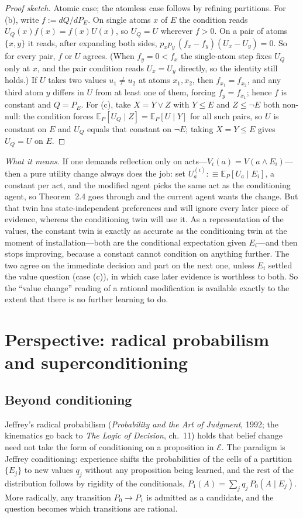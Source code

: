 \documentclass[11pt,a4paper]{article}
\newcommand{\E}{\mathbb{E}}
\newcommand{\cE}{\mathcal{E}}
\begin{document}
\begin{proof}[Proof sketch]
Atomic case; the atomless case follows by refining partitions. For (b), write $f := dQ/dP_E$. On single atoms $x$ of $E$ the condition reads $U_Q(x) f(x) = f(x) U(x)$, so $U_Q = U$ wherever $f > 0$. On a pair of atoms $\{x, y\}$ it reads, after expanding both sides, $p_x p_y\,(f_x - f_y)(U_x - U_y) = 0$. So for every pair, $f$ or $U$ agrees. (When $f_y = 0 < f_x$ the single-atom step fixes $U_Q$ only at $x$, and the pair condition reads $U_x = U_y$ directly, so the identity still holds.) If $U$ takes two values $u_1 \ne u_2$ at atoms $x_1, x_2$, then $f_{x_1} = f_{x_2}$, and any third atom $y$ differs in $U$ from at least one of them, forcing $f_y = f_{x_1}$; hence $f$ is constant and $Q = P_E$. For (c), take $X = Y \vee Z$ with $Y \le E$ and $Z \le \neg E$ both non-null: the condition forces $\E_P[U_Q \mid Z] = \E_P[U \mid Y]$ for all such pairs, so $U$ is constant on $E$ and $U_Q$ equals that constant on $\neg E$; taking $X = Y \le E$ gives $U_Q = U$ on $E$.
\end{proof}

\emph{What it means.} If one demands reflection only on acts---$V_i(a) = V(a \wedge E_i)$---then a pure utility change always does the job: set $U^{(i)}_a :\equiv \E_P[U_a \mid E_i]$, a constant per act, and the modified agent picks the same act as the conditioning agent, so Theorem~2.4 goes through and the current agent wants the change. But that twin has state-independent preferences and will ignore every later piece of evidence, whereas the conditioning twin will use it. As a representation of the values, the constant twin is exactly as accurate as the conditioning twin at the moment of installation---both are the conditional expectation given $E_i$---and then stops improving, because a constant cannot condition on anything further. The two agree on the immediate decision and part on the next one, unless $E_i$ settled the value question (case (c)), in which case later evidence is worthless to both. So the ``value change'' reading of a rational modification is available exactly to the extent that there is no further learning to do.

\section{Perspective: radical probabilism and superconditioning}

\subsection{Beyond conditioning}
Jeffrey's radical probabilism (\emph{Probability and the Art of Judgment}, 1992; the kinematics go back to \emph{The Logic of Decision}, ch.~11) holds that belief change need not take the form of conditioning on a proposition in $\cE$. The paradigm is Jeffrey conditioning: experience shifts the probabilities of the cells of a partition $\{E_j\}$ to new values $q_j$ without any proposition being learned, and the rest of the distribution follows by rigidity of the conditionals, $P_1(A) = \sum_j q_j\,P_0(A \mid E_j)$. More radically, any transition $P_0 \to P_1$ is admitted as a candidate, and the question becomes which transitions are rational.
\end{document}
